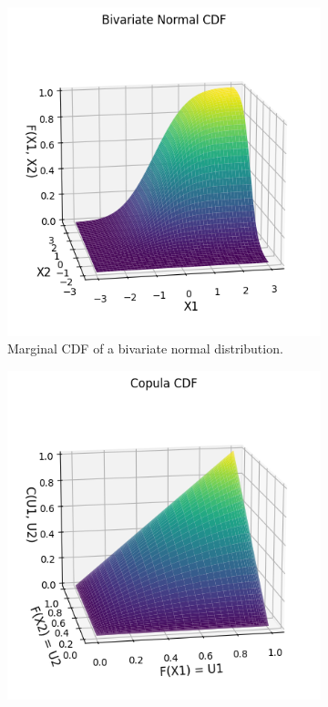 \begin{figure}
    \centering
    \begin{subfigure}[t]{0.45\linewidth}
        \centering
        \includegraphics[width=\linewidth]{3Theory/pictures/BivariateCDF.png}
        \caption{Marginal \gls{CDF} of a bivariate normal distribution.}
    \end{subfigure}
    \hfill
    \begin{subfigure}[t]{0.45\linewidth}
        \centering
        \includegraphics[width=\linewidth]{3Theory/pictures/BivariateCopula.png}

\end{subfigure}
\end{figure}
